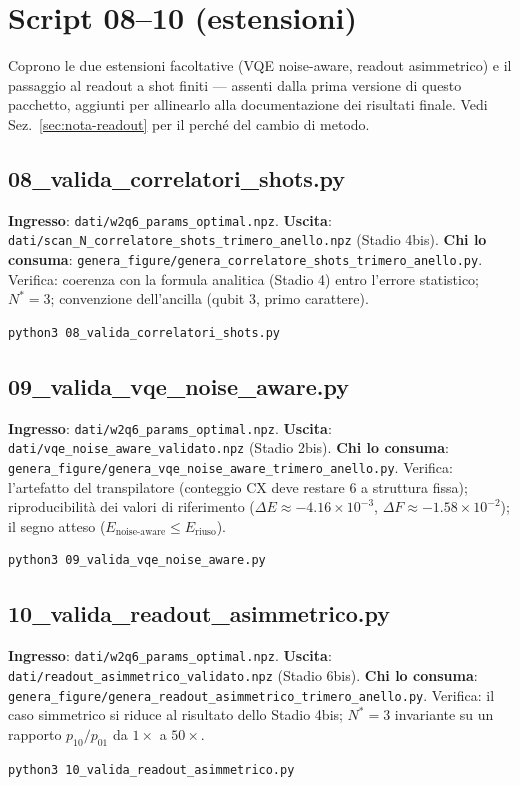 \documentclass[11pt,a4paper]{article}
\begin{document}
\section{Script 08--10 (estensioni)}
\label{sec:script-estensioni}

Coprono le due estensioni facoltative (VQE noise-aware, readout
asimmetrico) e il passaggio al readout a shot finiti --- assenti dalla
prima versione di questo pacchetto, aggiunti per allinearlo alla
documentazione dei risultati finale. Vedi Sez.~\ref{sec:nota-readout}
per il perché del cambio di metodo.

\subsection{08\_valida\_correlatori\_shots.py}
\textbf{Ingresso}: \texttt{dati/w2q6\_params\_optimal.npz}.
\textbf{Uscita}: \texttt{dati/scan\_N\_\allowbreak correlatore\_shots\_trimero\_anello.npz}
(Stadio 4bis). \textbf{Chi lo consuma}:
\texttt{genera\_figure/\allowbreak genera\_correlatore\_\allowbreak shots\_trimero\_anello.py}.
Verifica: coerenza con la formula analitica (Stadio 4) entro l'errore
statistico; $N^*=3$; convenzione dell'ancilla (qubit 3, primo carattere).
\begin{verbatim}
python3 08_valida_correlatori_shots.py
\end{verbatim}

\subsection{09\_valida\_vqe\_noise\_aware.py}
\textbf{Ingresso}: \texttt{dati/w2q6\_params\_optimal.npz}.
\textbf{Uscita}: \texttt{dati/vqe\_noise\_aware\_\allowbreak validato.npz} (Stadio 2bis).
\textbf{Chi lo consuma}:
\texttt{genera\_figure/\allowbreak genera\_vqe\_\allowbreak noise\_aware\_trimero\_anello.py}.
Verifica: l'artefatto del transpilatore (conteggio CX deve restare 6 a
struttura fissa); riproducibilità dei valori di riferimento
($\Delta E\approx-4.16\times10^{-3}$, $\Delta F\approx-1.58\times10^{-2}$);
il segno atteso ($E_\text{noise-aware}\leq E_\text{riuso}$).
\begin{verbatim}
python3 09_valida_vqe_noise_aware.py
\end{verbatim}

\subsection{10\_valida\_readout\_asimmetrico.py}
\textbf{Ingresso}: \texttt{dati/w2q6\_params\_optimal.npz}.
\textbf{Uscita}: \texttt{dati/readout\_\allowbreak asimmetrico\_validato.npz} (Stadio 6bis).
\textbf{Chi lo consuma}:
\texttt{genera\_figure/\allowbreak genera\_readout\_\allowbreak asimmetrico\_trimero\_anello.py}.
Verifica: il caso simmetrico si riduce al risultato dello Stadio 4bis;
$N^*=3$ invariante su un rapporto $p_{10}/p_{01}$ da $1\times$ a $50\times$.
\begin{verbatim}
python3 10_valida_readout_asimmetrico.py
\end{verbatim}
\end{document}
